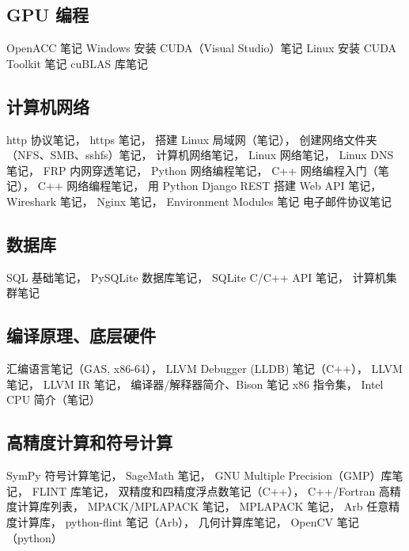 \subsection{GPU 编程}
OpenACC 笔记
Windows 安装 CUDA（Visual Studio）笔记
Linux 安装 CUDA Toolkit 笔记
cuBLAS 库笔记

\subsection{计算机网络}
http 协议笔记，
https 笔记，
搭建 Linux 局域网（笔记），
创建网络文件夹（NFS、SMB、sshfs）笔记，
计算机网络笔记，
Linux 网络笔记，
Linux DNS 笔记，
FRP 内网穿透笔记，
Python 网络编程笔记，
C++ 网络编程入门（笔记），
C++ 网络编程笔记，
用 Python Django REST 搭建 Web API 笔记，
Wireshark 笔记，
Nginx 笔记，
Environment Modules 笔记
电子邮件协议笔记

\subsection{数据库}
SQL 基础笔记，
PySQLite 数据库笔记，
SQLite C/C++ API 笔记，
计算机集群笔记

\subsection{编译原理、底层硬件}
汇编语言笔记（GAS, x86-64），
LLVM Debugger (LLDB) 笔记（C++），
LLVM 笔记，
LLVM IR 笔记，
编译器/解释器简介、Bison 笔记
x86 指令集，
Intel CPU 简介（笔记）

\subsection{高精度计算和符号计算}
SymPy 符号计算笔记，
SageMath 笔记，
GNU Multiple Precision（GMP）库笔记，
FLINT 库笔记，
双精度和四精度浮点数笔记（C++），
C++/Fortran 高精度计算库列表，
MPACK/MPLAPACK 笔记，
MPLAPACK 笔记，
Arb 任意精度计算库，
python-flint 笔记（Arb），
几何计算库笔记，
OpenCV 笔记（python）

